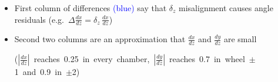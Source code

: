 \documentclass[compress]{beamer}
\begin{document}
\begin{frame}
\begin{itemize}
\vspace{-0.25 cm}
\[ \renewcommand{\arraystretch}{1.5}
\left(\begin{array}{c}
{\Delta x} \\
{\Delta y} \\
{\Delta \frac{dx}{dz}} \\
{\Delta \frac{dy}{dz}} \\
\end{array}\right)
=
\left(\begin{array}{c c c c c c}
-1 & \textcolor{white}{-}0 & \frac{dx}{dz} & y \frac{dx}{dz} & -x \frac{dx}{dz} & \textcolor{white}{-}y \\
\textcolor{white}{-}0 & -1 & \frac{dy}{dz} & y \frac{dy}{dz} & -x \frac{dy}{dz} & -x \\
\textcolor{white}{-}0 & \textcolor{white}{-}0 & \textcolor{blue}{\frac{dx}{dz}} & \textcolor{blue}{0} & \textcolor{blue}{-1} & \textcolor{white}{-}\frac{dy}{dz} \\
\textcolor{white}{-}0 & \textcolor{white}{-}0 & \textcolor{blue}{\frac{dy}{dz}} & \textcolor{blue}{1} & \textcolor{white}{-}\textcolor{blue}{0} & -\frac{dx}{dz}
\end{array}\right)
\renewcommand{\arraystretch}{1.05}
\left(\begin{array}{c}
\delta_x \\
\delta_y \\
\delta_z \\
\delta_{\phi_x} \\
\delta_{\phi_y} \\
\delta_{\phi_z}
\end{array}\right)
\]

\item First column of differences \textcolor{blue}{(blue)} say that $\delta_z$ misalignment causes angle residuals (e.g.~$\Delta \frac{dx}{dz} = \delta_z \, \frac{dx}{dz}$)

\item Second two columns are an approximation that $\frac{dx}{dz}$ and $\frac{dy}{dz}$ are small

\mbox{($\left|\frac{dx}{dz}\right|$ reaches 0.25 in every chamber, $\left|\frac{dy}{dz}\right|$ reaches 0.7 in wheel $\pm$1 and 0.9 in $\pm$2)\hspace{-1 cm}}
\end{itemize}
\end{frame}
\end{document}
